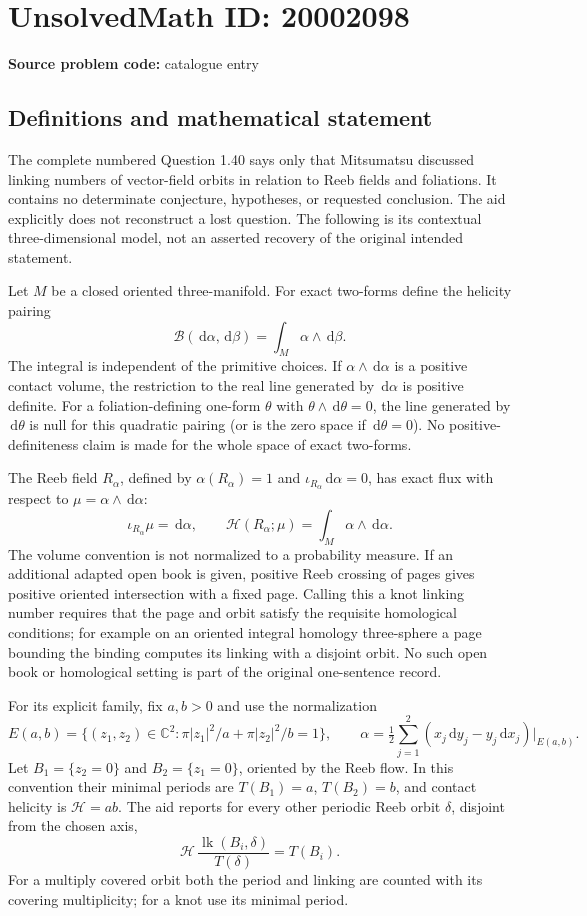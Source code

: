 \documentclass[11pt]{article}
\newcommand{\C}{\mathbb{C}}
\newcommand{\dd}{\,\mathrm{d}}
\begin{document}
\section*{UnsolvedMath ID: 20002098}
\textbf{Source problem code:} catalogue entry
\subsection{Definitions and mathematical statement}
The complete numbered Question 1.40 says only that Mitsumatsu discussed linking numbers of vector-field orbits in relation to Reeb fields and foliations. It contains no determinate conjecture, hypotheses, or requested conclusion. The aid explicitly does not reconstruct a lost question. The following is its contextual three-dimensional model, not an asserted recovery of the original intended statement.

Let \(M\) be a closed oriented three-manifold. For exact two-forms define the helicity pairing
\[
 \mathcal B(\dd\alpha,\dd\beta)=\int_M\alpha\wedge\dd\beta.
\]
The integral is independent of the primitive choices. If \(\alpha\wedge\dd\alpha\) is a positive contact volume, the restriction to the real line generated by \(\dd\alpha\) is positive definite. For a foliation-defining one-form \(\theta\) with \(\theta\wedge\dd\theta=0\), the line generated by \(\dd\theta\) is null for this quadratic pairing (or is the zero space if \(\dd\theta=0\)). No positive-definiteness claim is made for the whole space of exact two-forms.

The Reeb field \(R_\alpha\), defined by \(\alpha(R_\alpha)=1\) and \(\iota_{R_\alpha}\dd\alpha=0\), has exact flux with respect to \(\mu=\alpha\wedge\dd\alpha\):
\[
 \iota_{R_\alpha}\mu=\dd\alpha,\qquad
 \mathcal H(R_\alpha;\mu)=\int_M\alpha\wedge\dd\alpha.
\]
The volume convention is not normalized to a probability measure. If an additional adapted open book is given, positive Reeb crossing of pages gives positive oriented intersection with a fixed page. Calling this a knot linking number requires that the page and orbit satisfy the requisite homological conditions; for example on an oriented integral homology three-sphere a page bounding the binding computes its linking with a disjoint orbit. No such open book or homological setting is part of the original one-sentence record.

For its explicit family, fix \(a,b>0\) and use the normalization
\[
 E(a,b)=\{(z_1,z_2)\in\C^2:\pi|z_1|^2/a+\pi|z_2|^2/b=1\},
 \qquad \alpha=\tfrac12\sum_{j=1}^2(x_j\dd y_j-y_j\dd x_j)|_{E(a,b)}.
\]
Let \(B_1=\{z_2=0\}\) and \(B_2=\{z_1=0\}\), oriented by the Reeb flow. In this convention their minimal periods are \(T(B_1)=a\), \(T(B_2)=b\), and contact helicity is \(\mathcal H=ab\). The aid reports for every other periodic Reeb orbit \(\delta\), disjoint from the chosen axis,
\[
 \mathcal H\,\frac{\operatorname{lk}(B_i,\delta)}{T(\delta)}=T(B_i).
\]
For a multiply covered orbit both the period and linking are counted with its covering multiplicity; for a knot use its minimal period.
\end{document}
